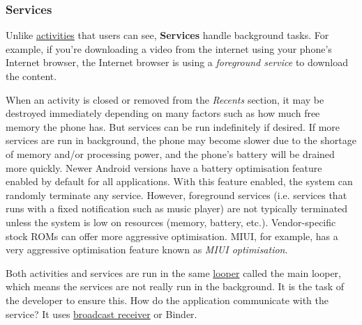 \subsubsection{Services}\label{subsubsec:details:servcies} %
Unlike \hyperref[subsubsec:activities]{activities} that users can see, \textbf{Services} handle background tasks. For example,
if you're downloading a video from the internet using your phone's Internet browser, the Internet browser is using a
\textit{foreground service} to download the content.

When an activity is closed or removed from the \textit{Recents} section, it may be destroyed immediately depending on
many factors such as how much free memory the phone has. But services can be run indefinitely if desired. If more
services are run in background, the phone may become slower due to the shortage of memory and/or processing power, and
the phone's battery will be drained more quickly. Newer Android versions have a battery optimisation feature enabled
by default for all applications. With this feature enabled, the system can randomly terminate any service. However,
foreground services (i.e. services that runs with a fixed notification such as music player) are not typically
terminated unless the system is low on resources (memory, battery, etc.). Vendor-specific stock ROMs can offer more
aggressive optimisation. MIUI, for example, has a very aggressive optimisation feature known as \textit{MIUI optimisation}.

Both activities and services are run in the same \href{https://stackoverflow.com/questions/7597742}{looper} called
the main looper, which means the services are not really run in the background. It is the task of the developer to
ensure this. How do the application communicate with the service? It uses
\hyperref[subsubsec:app-details-receivers]{broadcast receiver} or Binder.

